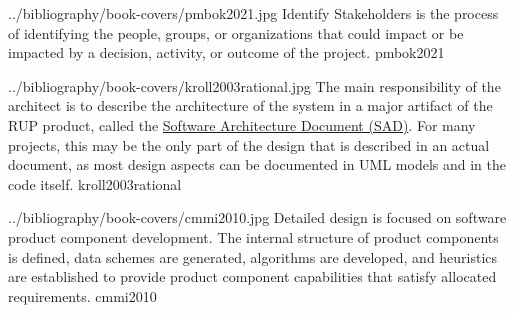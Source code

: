\documentclass{article}
\begin{document}



\lnQuote
  {../bibliography/book-covers/pmbok2021.jpg}
  {Identify Stakeholders is the process of identifying the people, groups, or organizations that could impact or be impacted by a decision, activity, or outcome of the project.}
  {pmbok2021}







\lnQuote
  {../bibliography/book-covers/kroll2003rational.jpg}
  {The main responsibility of the architect is to describe the architecture of the system in a major artifact of the RUP product, called the \ul{Software Architecture Document (SAD)}. For many projects, this may be the only part of the design that is described in an actual document, as most design aspects can be documented in UML models and in the code itself.}
  {kroll2003rational}


\lnQuote
  {../bibliography/book-covers/cmmi2010.jpg}
  {Detailed design is focused on software product component development. The internal structure of product components is defined, data schemes are generated, algorithms are developed, and heuristics are established to provide product component capabilities that satisfy allocated requirements.}
  {cmmi2010}
\end{document}
